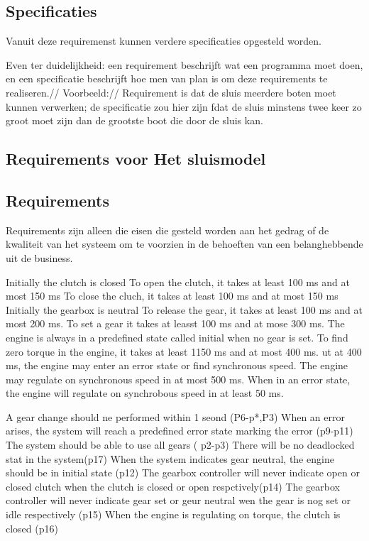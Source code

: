 \subsection{Specificaties}
Vanuit deze requiremenst kunnen verdere specificaties opgesteld worden.

Even ter duidelijkheid: een requirement beschrijft wat een programma moet doen, en een specificatie beschrijft hoe men van plan is om deze requirements te realiseren.//
Voorbeeld:// Requirement is dat de sluis meerdere boten moet kunnen verwerken; de specificatie zou hier zijn fdat de sluis minstens twee keer zo groot moet zijn dan de grootste boot die door de sluis kan.





\subsection{Requirements voor Het sluismodel}


\subsection{Requirements}
Requirements zijn alleen die eisen die gesteld worden aan het gedrag of de kwaliteit van het systeem om te voorzien in de behoeften van een belanghebbende uit de business.



Initially the clutch is closed
To open the clutch, it takes at least 100 ms and at most 150 ms
To close the cluch, it takes at least 100 ms and at most 150 ms
Initially the gearbox is neutral
To release the gear, it takes at least 100 ms and at most 200 ms.
To set a gear it takes at leasst 100 ms and at mose 300 ms.
The engine is always in a predefined state called initial when no gear is set.
To find zero torque in the engine, it takes at least 1150 ms and at most 400 ms. ut at 400 ms, the engine may enter an error state or find synchronous speed.
The  engine may regulate on synchronous speed in at most 500 ms.
When in an error state, the engine will regulate on synchrobous speed in at least 50 ms.


A gear change should ne performed within 1 seond (P6-p*,P3)
When an error arises, the system will reach a predefined error state marking the error (p9-p11)
The system should be able to use all gears ( p2-p3)
There will be no deadlocked stat in the system(p17)
When the system indicates gear neutral, the engine should  be in initial state (p12)
The gearbox controller will never indicate open or closed clutch when the clutch is closed or open respctively(p14)
The gearbox controller will never indicate gear set or geur neutral wen the gear is nog set or idle respectively (p15)
When the engine is regulating on torque, the clutch is closed (p16)




